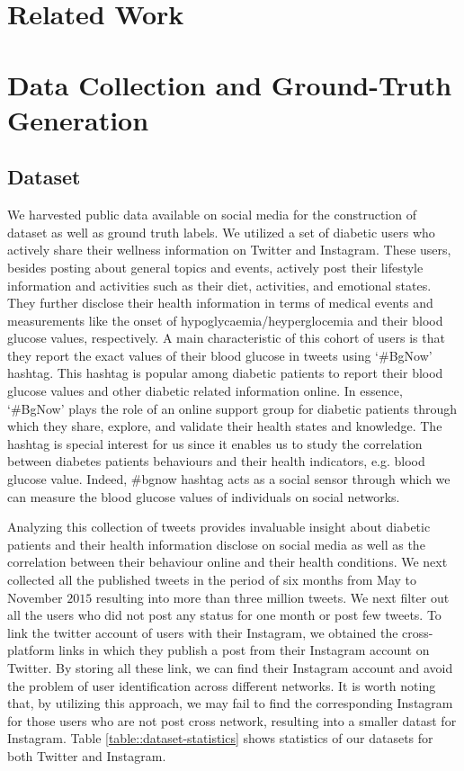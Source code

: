 \documentclass{acm_proc_article-sp}
\begin{document}
\section{Related Work}


\section{Data Collection and Ground-Truth Generation}
\subsection{Dataset}
We harvested public data available on social media for the construction of dataset as well as ground truth labels. We utilized a set of diabetic users who actively share their wellness information on Twitter and Instagram.  These users, besides posting about general topics and events, actively post their lifestyle information and activities such as their diet, activities, and emotional states. They further disclose their health information in terms of medical events and measurements like the onset of hypoglycaemia/heyperglocemia and their blood glucose values, respectively. A main characteristic of this cohort of users is that they report the exact values of their blood glucose in tweets using `\#BgNow' hashtag. This hashtag is popular among diabetic patients to report their blood glucose values and other diabetic related information online. In essence, `\#BgNow' plays the role of an online support group for diabetic patients through which they share, explore, and validate their health states and knowledge. The hashtag is special interest for us since it enables us to study  the correlation between diabetes patients behaviours  and their health indicators, e.g. blood glucose value. Indeed, \#bgnow hashtag acts as a social sensor through which we can measure the blood glucose values of individuals on social networks.

Analyzing this collection of tweets provides invaluable insight about diabetic patients and their health information disclose on social media  as well as the correlation between their behaviour online and their health conditions. We next collected all the published tweets in the period of six months from May to November $2015$ resulting into more than three million tweets. We next filter out all the users who did not post any status for one month or post few tweets. To link the twitter account of users with their Instagram, we obtained the cross-platform links in which they publish a post from their Instagram account on Twitter. By storing all these link, we can find their Instagram account and avoid the problem of user identification across different networks\cite{vosecky2009user}. It is worth noting that, by utilizing this approach, we may fail to find the corresponding Instagram for those users who are not post cross network, resulting into a smaller datast for Instagram. Table \ref{table::dataset-statistics} shows statistics of our datasets for both Twitter and Instagram.
\end{document}
